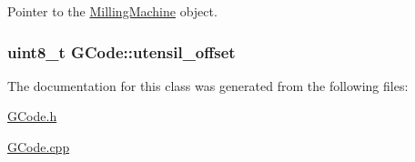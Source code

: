 Pointer to the \hyperlink{class_milling_machine}{Milling\+Machine} object. 

\hypertarget{class_g_code_a33ac8c517b978b71a6af37c362dc3edb}{
\subsubsection[{utensil\+\_\+offset}]{\setlength{\rightskip}{0pt plus 5cm}uint8\+\_\+t G\+Code\+::utensil\+\_\+offset}}\label{class_g_code_a33ac8c517b978b71a6af37c362dc3edb}


The documentation for this class was generated from the following files\+:\begin{DoxyCompactItemize}
\item 
\hyperlink{_g_code_8h}{G\+Code.\+h}\item 
\hyperlink{_g_code_8cpp}{G\+Code.\+cpp}\end{DoxyCompactItemize}
